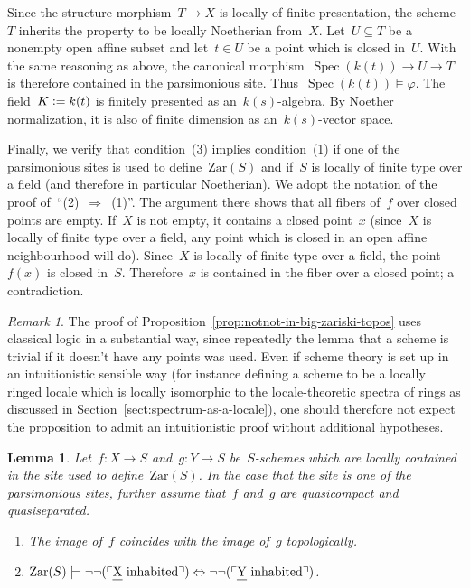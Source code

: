 \documentclass[10pt,reqno,a4paper]{amsbook}
\makeatletter
\theoremstyle{definition}
\theoremstyle{plain}
\newtheorem{lemma}[defn]{Lemma}
\theoremstyle{remark}
\newtheorem{rem}[defn]{Remark}
\let\oldul\ul
\renewcommand{\ul}[1]{\text{\oldul{$#1$}}}
\newcommand{\Zar}{\mathrm{Zar}}
\DeclareMathOperator{\Spec}{Spec}
\newcommand{\?}{\,{:}\,}
\renewcommand{\_}{\mathpunct{.}\,}
\newcommand{\speak}[1]{\ulcorner\text{\textnormal{#1}}\urcorner}
\newcommand{\defeq}{\vcentcolon=}
\renewenvironment{proof}[1][\proofname]{\par
  \pushQED{\qed}%
  \normalfont \topsep6\p@\@plus6\p@\relax
  \trivlist
  \item[\hskip\labelsep
        \itshape
    #1\@addpunct{.}]\ignorespaces
}{%
  \popQED\endtrivlist\@endpefalse
}
\makeatother
\begin{document}
\begin{proof}
Since the structure morphism~$T \to X$ is locally of finite presentation, the
scheme~$T$ inherits the property to be locally Noetherian from~$X$. Let~$U
\subseteq T$ be a nonempty open affine subset and let~$t \in U$ be a point
which is closed in~$U$. With the same reasoning as above, the canonical
morphism~$\Spec(k(t)) \to U \to T$ is therefore contained in the parsimonious
site. Thus~$\Spec(k(t)) \models \varphi$. The field~$K \defeq k(t)$ is finitely
presented as an~$k(s)$-algebra. By Noether normalization, it is also of finite
dimension as an~$k(s)$-vector space.

Finally, we verify that condition~(3) implies condition~(1) if one of the
parsimonious sites is used to define~$\Zar(S)$ and if~$S$ is locally
of finite type over a field (and therefore in particular Noetherian). We adopt
the notation of the proof of~``(2)~$\Rightarrow$~(1)''. The argument there
shows that all fibers of~$f$ over closed points are empty. If~$X$ is not empty,
it contains a closed point~$x$ (since~$X$ is locally of finite type over a field,
any point which is closed in an open affine neighbourhood will do). Since~$X$
is locally of finite type over a field, the point~$f(x)$ is closed in~$S$.
Therefore~$x$ is contained in the fiber over a closed point; a contradiction.
\end{proof}

\begin{rem}The proof of Proposition~\ref{prop:notnot-in-big-zariski-topos} uses
classical logic in a substantial way, since repeatedly the lemma that a scheme
is trivial if it doesn't have any points was used. Even if scheme theory is
set up in an intuitionistic sensible way (for instance defining a scheme to be
a locally ringed locale which is locally isomorphic to the locale-theoretic
spectra of rings as discussed in Section~\ref{sect:spectrum-as-a-locale}), one
should therefore not expect the proposition to admit an intuitionistic proof
without additional hypotheses.
\end{rem}

\begin{lemma}\label{lemma:image-coincides}
Let~$f : X \to S$ and~$g : Y \to S$ be~$S$-schemes which are locally contained
in the site used to define~$\Zar(S)$. In the case that the site is one of the
parsimonious sites, further assume that~$f$ and~$g$ are quasicompact and quasiseparated.
\begin{enumerate}
\item The image of~$f$ coincides with the image of~$g$ topologically.
\item $\Zar(S) \models \neg\neg(\speak{$\ul{X}$ inhabited}) \Leftrightarrow
  \neg\neg(\speak{$\ul{Y}$ inhabited})$.
\end{enumerate}
\end{lemma}
\end{document}
